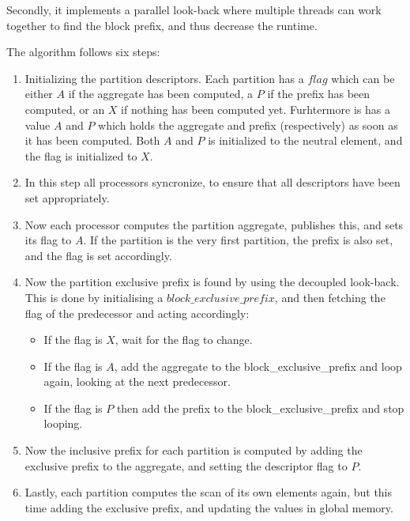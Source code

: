 Secondly, it implements a parallel look-back where multiple threads can work together to find the block prefix,  and thus decrease the runtime.

The algorithm follows six steps:
\begin{enumerate}
  \item Initializing the partition descriptors. Each partition has a $flag$ which can be either $A$ if the aggregate has been computed, a $P$ if the prefix has been computed, or an $X$ if nothing has been computed yet.
        Furhtermore is has a value $A$ and $P$ which holds the aggregate and prefix (respectively) as soon as it has been computed.
        Both $A$ and $P$ is initialized to the neutral element, and the flag is initialized to $X$.
  \item In this step all processors syncronize, to ensure that all descriptors have been set appropriately.
  \item Now each processor computes the partition aggregate, publishes this, and sets its flag to $A$. If the partition is the very first partition, the prefix is also set, and the flag is set accordingly.
  \item Now the partition exclusive prefix is found by using the decoupled look-back.
        This is done by initialising a $block\_exclusive\_prefix$, and then fetching the flag of the predecessor and acting accordingly:
        \begin{itemize}
          \item If the flag is $X$, wait for the flag to change.
          \item If the flag is $A$, add the aggregate to the block\_exclusive\_prefix and loop again, looking at the next predecessor.
          \item If the flag is $P$ then add the prefix to the block\_exclusive\_prefix and stop looping.
        \end{itemize}
  \item Now the inclusive prefix for each partition is computed by adding the exclusive prefix to the aggregate, and setting the descriptor flag to $P$.
  \item Lastly, each partition computes the scan of its own elements again, but this time adding the exclusive prefix, and updating the values in global memory.
\end{enumerate}


